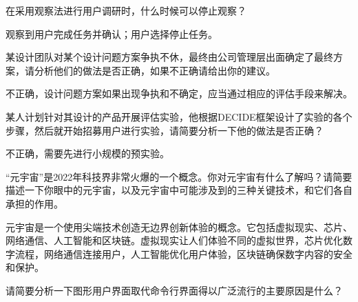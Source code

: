 \begin{problem}[2021、2023]
在采用观察法进行用户调研时，什么时候可以停止观察？
\end{problem}

\begin{solution}
观察到用户完成任务并确认；用户选择停止任务。
\end{solution}




\begin{problem}[2021、2023]
某设计团队对某个设计问题方案争执不休，最终由公司管理层出面确定了最终方案，请分析他们的做法是否正确，如果不正确请给出你的建议。
\end{problem}

\begin{solution}
不正确，设计问题方案如果出现争执和不确定，应当通过相应的评估手段来解决。
\end{solution}



\begin{problem}[2021、2023]
某人计划针对其设计的产品开展评估实验，他根据DECIDE框架设计了实验的各个步骤，然后就开始招募用户进行实验，请简要分析一下他的做法是否正确？
\end{problem}

\begin{solution}
不正确，需要先进行小规模的预实验。
\end{solution}



\begin{problem}[2022]
“元宇宙”是2022年科技界非常火爆的一个概念。你对元宇宙有什么了解吗？请简要描述一下你眼中的元宇宙，以及元宇宙中可能涉及到的三种关键技术，和它们各自承担的作用。
\end{problem}

\begin{solution}
元宇宙是一个使用尖端技术创造无边界创新体验的概念。它包括虚拟现实、芯片、网络通信、人工智能和区块链。虚拟现实让人们体验不同的虚拟世界，芯片优化数字流程，网络通信连接用户，人工智能优化用户体验，区块链确保数字内容的安全和保护。
\end{solution}



\begin{problem}[2022]
请简要分析一下图形用户界面取代命令行界面得以广泛流行的主要原因是什么？
\end{problem}

